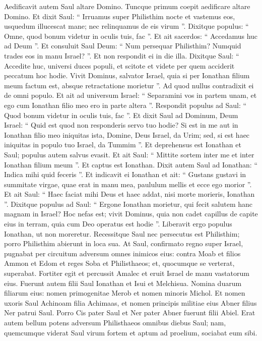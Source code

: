\begin{biblechapter}
\begin{biblechapter}
\begin{biblechapter}
\begin{biblechapter}
\begin{biblechapter}
\begin{biblechapter}
\begin{biblechapter}
\begin{biblechapter}
\begin{biblechapter}
\begin{biblechapter}
\begin{biblechapter}
\begin{biblechapter}
\begin{biblechapter}
\begin{biblechapter}
\verse Aedificavit autem Saul altare Domino. Tuncque primum coepit aedificare altare Domino.
 \verse Et dixit Saul: “ Irruamus super Philisthim nocte et vastemus eos, usquedum illucescat mane; nec relinquamus de eis virum ”. Dixitque populus: “ Omne, quod bonum videtur in oculis tuis, fac ”. Et ait sacerdos: “ Accedamus huc ad Deum ”. 
 \verse Et consuluit Saul Deum: “ Num persequar Philisthim? Numquid trades eos in manu Israel? ”. Et non respondit ei in die illa. 
\verse Dixitque Saul: “ Accedite huc, universi duces populi, et scitote et videte per quem acciderit peccatum hoc hodie. 
\verse Vivit Dominus, salvator Israel, quia si per Ionathan filium meum factum est, absque retractatione morietur ”. Ad quod nullus contradixit ei de omni populo.
 \verse Et ait ad universum Israel: “ Separamini vos in partem unam, et ego cum Ionathan filio meo ero in parte altera ”. Respondit populus ad Saul: “ Quod bonum videtur in oculis tuis, fac ”. 
\verse Et dixit Saul ad Dominum, Deum Israel: “ Quid est quod non responderis servo tuo hodie? Si est in me aut in Ionathan filio meo iniquitas ista, Domine, Deus Israel, da Urim; sed, si est haec iniquitas in populo tuo Israel, da Tummim ”. Et deprehensus est Ionathan et Saul; populus autem salvus evasit. 
\verse Et ait Saul: “ Mittite sortem inter me et inter Ionathan filium meum ”. Et captus est Ionathan.
 \verse Dixit autem Saul ad Ionathan: “ Indica mihi quid feceris ”. Et indicavit ei Ionathan et ait: “ Gustans gustavi in summitate virgae, quae erat in manu mea, paululum mellis et ecce ego morior ”. 
\verse Et ait Saul: “ Haec faciat mihi Deus et haec addat, nisi morte morieris, Ionathan ”. 
\verse Dixitque populus ad Saul: “ Ergone Ionathan morietur, qui fecit salutem hanc magnam in Israel? Hoc nefas est; vivit Dominus, quia non cadet capillus de capite eius in terram, quia cum Deo operatus est hodie ”. Liberavit ergo populus Ionathan, ut non moreretur.
 \verse Recessitque Saul nec persecutus est Philisthim; porro Philisthim abierunt in loca sua.
 \verse At Saul, confirmato regno super Israel, pugnabat per circuitum adversum omnes inimicos eius: contra Moab et filios Ammon et Edom et reges Soba et Philisthaeos; et, quocumque se verterat, superabat. 
\verse Fortiter egit et percussit Amalec et eruit Israel de manu vastatorum eius.
 \verse Fuerunt autem filii Saul Ionathan et Isui et Melchisua. Nomina duarum filiarum eius: nomen primogenitae Merob et nomen minoris Michol. 
\verse Et nomen uxoris Saul Achinoam filia Achimaas, et nomen principis militiae eius Abner filius Ner patrui Saul. 
\verse Porro Cis pater Saul et Ner pater Abner fuerunt filii Abiel.
 \verse Erat autem bellum potens adversum Philisthaeos omnibus diebus Saul; nam, quemcumque viderat Saul virum fortem et aptum ad proelium, sociabat eum sibi.
 

\end{biblechapter}
\end{biblechapter}
\end{biblechapter}
\end{biblechapter}
\end{biblechapter}
\end{biblechapter}
\end{biblechapter}
\end{biblechapter}
\end{biblechapter}
\end{biblechapter}
\end{biblechapter}
\end{biblechapter}
\end{biblechapter}
\end{biblechapter}
